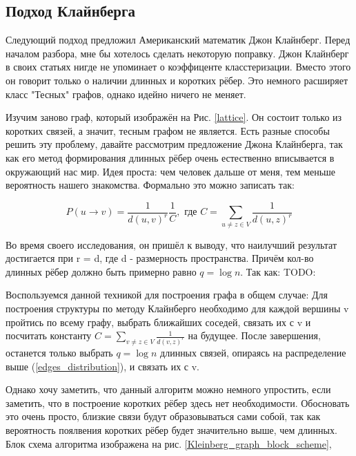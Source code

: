 \subsection{Подход Клайнберга}

Следующий подход предложил Американский математик Джон Клайнберг. Перед началом разбора,
мне бы хотелось сделать некоторую поправку. Джон Клайнберг в своих статьях нигде не 
упоминает о коэффиценте класстеризации. Вместо этого он говорит только о наличии длинных
и коротких рёбер. Это немного расширяет класс "Тесных" графов, однако идейно 
ничего не меняет.

    Изучим заново граф, который изображён на Рис. \ref{lattice}. Он состоит только из
коротких связей, а значит, тесным графом не является. Есть разные способы решить эту проблему,
давайте рассмотрим предложение Джона Клайнберга, так как его метод формирования длинных
рёбер очень естественно вписывается в окружающий нас мир. Идея проста: чем человек дальше от меня, тем меньше
вероятность нашего знакомства. Формально это можно записать так:

\begin{equation} \label{edges_distribution}
    P(u \rightarrow v) = \frac{1}{d(u, v)^r}\frac{1}{C}, \text{ где } C = \sum_{u \neq z \in V}\frac{1}{d(u, z)^r}
\end{equation}

Во время своего исследования, он пришёл к выводу, что наилучший результат достигается при 
r = d, где d - размерность пространства. Причём кол-во длинных рёбер должно быть 
примерно равно $q = \log{n}$. Так как: TODO:

Воспользуемся данной техникой для построения графа в общем случае: Для построения структуры 
по методу Клайнберго необходимо для каждой вершины v пройтись по всему графу, выбрать ближайших
соседей, связать их с v и посчитать константу $C = \sum_{v \neq z \in V}\frac{1}{d(v, z)^r}$ на будущее.
После завершения, останется только выбрать $q = \log{n}$ длинных связей, опираясь на распределение выше 
(\ref{edges_distribution}), и связать их с v.

Однако хочу заметить, что данный алгоритм можно немного упростить, если заметить, что в
построение коротких рёбер здесь нет необходимости. Обосновать это очень просто, близкие связи
будут образовываться сами собой, так как вероятность поялвения коротких рёбер будет значительно выше, 
чем длинных. Блок схема алгоритма изображена на рис. \ref{Kleinberg_graph_block_scheme}, 

